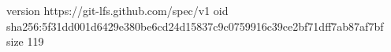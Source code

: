 version https://git-lfs.github.com/spec/v1
oid sha256:5f31dd001d6429e380be6cd24d15837c9c0759916c39ce2bf71dff7ab87af7bf
size 119

